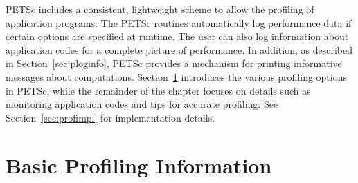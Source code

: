 PETSc includes a consistent, lightweight scheme to allow the profiling
of application programs.  The PETSc routines automatically log
performance data if certain options are specified at runtime.  The
user can also log information about application codes for a complete
picture of performance.  In addition, as described in
Section~\ref{sec:ploginfo}, PETSc provides a mechanism for printing
informative messages about computations.  Section~\ref{sec:profbasic}
introduces the various profiling options in PETSc, while the
remainder of the chapter focuses on details such as monitoring
application codes and tips for accurate profiling.  See
Section~\ref{sec:profimpl} for implementation details.

\section{Basic Profiling Information}
\label{sec:profbasic}
   

